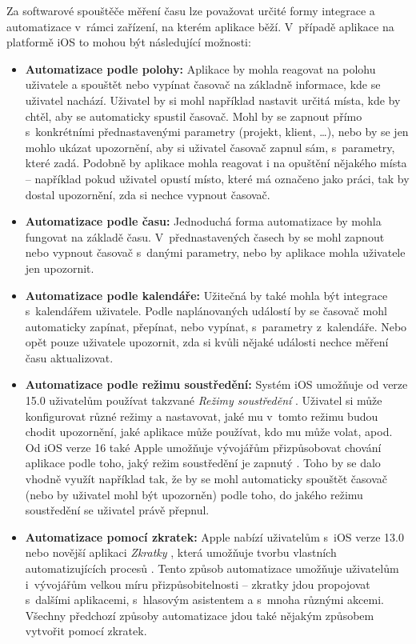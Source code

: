 Za softwarové spouštěče měření času lze považovat určité formy integrace a automatizace v~rámci zařízení, na kterém aplikace běží. V~případě aplikace na platformě iOS to mohou být následující možnosti:
\begin{itemize}
\item\textbf{Automatizace podle polohy:} Aplikace by mohla reagovat na polohu uživatele a spouštět nebo vypínat časovač na základně informace, kde se uživatel nachází. Uživatel by si mohl například nastavit určitá místa, kde by chtěl, aby se automaticky spustil časovač. Mohl by se zapnout přímo s~konkrétními přednastavenými parametry (projekt, klient, \dots), nebo by se jen mohlo ukázat upozornění, aby si uživatel časovač zapnul sám, s~parametry, které zadá. Podobně by aplikace mohla reagovat i na opuštění nějakého místa – například pokud uživatel opustí místo, které má označeno jako práci, tak by dostal upozornění, zda si nechce vypnout časovač.
\item\textbf{Automatizace podle času:} Jednoduchá forma automatizace by mohla fungovat na základě času. V~přednastavených časech by se mohl zapnout nebo vypnout časovač s~danými parametry, nebo by aplikace mohla uživatele jen upozornit.
\item\textbf{Automatizace podle kalendáře:} Užitečná by také mohla být integrace s~kalendářem uživatele. Podle naplánovaných událostí by se časovač mohl automaticky zapínat, přepínat, nebo vypínat, s~parametry z~kalendáře. Nebo opět pouze uživatele upozornit, zda si kvůli nějaké události nechce měření času aktualizovat.
\item\textbf{Automatizace podle režimu soustředění:} Systém iOS umožňuje od verze 15.0 uživatelům používat takzvané \emph{Režimy soustředění} \cite{ios-focus-modes}. Uživatel si může konfigurovat různé režimy a nastavovat, jaké mu v~tomto režimu budou chodit upozornění, jaké aplikace může používat, kdo mu může volat, apod. Od iOS verze 16 také Apple umožňuje vývojářům přizpůsobovat chování aplikace podle toho, jaký režim soustředění je zapnutý \cite{ios-focus-modes-adjustment}. Toho by se dalo vhodně využít například tak, že by se mohl automaticky spouštět časovač (nebo by uživatel mohl být upozorněn) podle toho, do jakého režimu soustředění se uživatel právě přepnul.
\item\textbf{Automatizace pomocí zkratek:} Apple nabízí uživatelům s~iOS verze 13.0 nebo novější aplikaci \emph{Zkratky} \cite{ios-shortcuts-app}, která umožňuje tvorbu vlastních automatizujících procesů \cite{ios-shortcuts}. Tento způsob automatizace umožňuje uživatelům i~vývojářům velkou míru přizpůsobitelnosti – zkratky jdou propojovat s~dalšími aplikacemi, s~hlasovým asistentem a s~mnoha různými akcemi. Všechny předchozí způsoby automatizace jdou také nějakým způsobem vytvořit pomocí zkratek. \cite{ios-shortcuts-developer}
\end{itemize}

